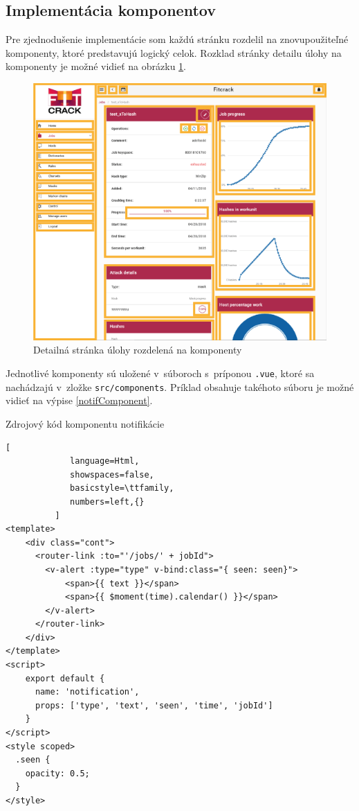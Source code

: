 \documentclass[slovak]{fitthesis}
\begin{document}
\subsection{Implementácia komponentov}
Pre zjednodušenie implementácie som každú stránku rozdelil na znovupoužiteľné komponenty, ktoré predstavujú logický celok. Rozklad stránky detailu úlohy na komponenty je možné vidieť na obrázku \ref{fig:komponenty}.
\begin{figure}[H]
    \centering
    \includegraphics[scale=0.45]{obrazky/komponenty.png}
    \caption{Detailná stránka úlohy rozdelená na komponenty}
    \label{fig:komponenty}
\end{figure}
Jednotlivé komponenty sú uložené v~súboroch s~príponou \texttt{.vue}, ktoré sa nachádzajú v~zložke \texttt{src/components}. Príklad obsahuje takéhoto súboru je možné vidieť na výpise \ref{notifComponent}.

\begin{algorithm}[H]
  \caption{Zdrojový kód komponentu notifikácie}
  \label{notifComponent}
  \begin{lstlisting}[
             language=Html,
             showspaces=false,
             basicstyle=\ttfamily,
             numbers=left,{}
          ]
<template>
    <div class="cont">
      <router-link :to="'/jobs/' + jobId">
        <v-alert :type="type" v-bind:class="{ seen: seen}">
            <span>{{ text }}</span>
            <span>{{ $moment(time).calendar() }}</span>
        </v-alert>
      </router-link>
    </div>
</template>
<script>
    export default {
      name: 'notification',
      props: ['type', 'text', 'seen', 'time', 'jobId']
    }
</script>
<style scoped>
  .seen {
    opacity: 0.5;
  }
</style>
  \end{lstlisting}
\end{algorithm}
\end{document}
